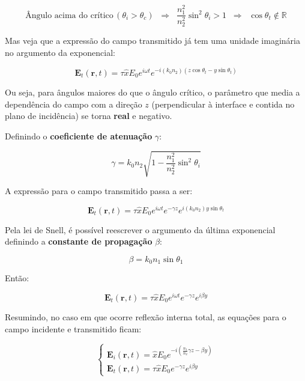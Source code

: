 \documentclass[12pt,a4paper]{report}
\begin{document}
\begin{equation*}
    \text{Ângulo acima do crítico}\,(\theta_i>\theta_c)\;\;\Rightarrow\;\;\frac{n_1^2}{n_2^2}\sin^2\theta_i>1\;\;\Rightarrow\;\;\cos\theta_t\notin \mathbb{R}
\end{equation*}

Mas veja que a expressão do campo transmitido já tem uma unidade imaginária no argumento da exponencial:

\begin{equation*}
     \textbf{E}_t(\textbf{r},t)=\tau\hat{x}E_0e^{i\omega t}e^{-i(k_0n_2)(z\cos\theta_t-y\sin\theta_t)}
\end{equation*}

Ou seja, para ângulos maiores do que o ângulo crítico, o parâmetro que media a dependência do campo com a direção $z$ (perpendicular à interface e contida no plano de incidência) se torna \textbf{real} e negativo.

Definindo o \textbf{coeficiente de atenuação} $\gamma$:

\begin{equation}
    \boxed{\gamma=k_0n_2\sqrt{1-\frac{n_1^2}{n_2^2}\sin^2\theta_i}}
\end{equation}

A expressão para o campo transmitido passa a ser:

\begin{equation*}
     \textbf{E}_t(\textbf{r},t)=\tau\hat{x}E_0e^{i\omega t}e^{-\gamma z}e^{i(k_0n_2)y\sin\theta_t}
\end{equation*}

Pela lei de Snell, é possível reescrever o argumento da última exponencial definindo a \textbf{constante de propagação} $\beta$:

\begin{equation}
    \boxed{\beta=k_0n_1\sin\theta_1}
    \label{constante.de.propagação}
\end{equation}

Então:

\begin{equation*}
     \textbf{E}_t(\textbf{r},t)=\tau\hat{x}E_0e^{i\omega t}e^{-\gamma z}e^{i\beta y}
\end{equation*}

Resumindo, no caso em que ocorre reflexão interna total, as equações para o campo incidente e transmitido ficam:

\begin{equation*}
    \begin{cases}
    \textbf{E}_i(\textbf{r},t)=\hat{x}E_0e^{-i(\frac{n_1}{n_2}\gamma z-\beta y)}\\
    
    \textbf{E}_t(\textbf{r},t)=\tau\hat{x}E_0e^{-\gamma z}e^{i\beta y}
    \end{cases}
\end{equation*}
\end{document}
